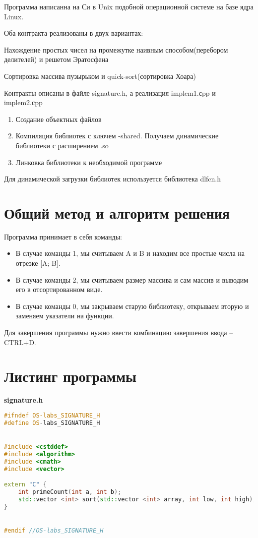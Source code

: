 \documentclass[pdf, unicode, 12pt, a4paper,oneside,fleqn]{article}
\begin{document}
Программа написанна на Си в Unix подобной операционной системе на базе ядра Linux.

Оба контракта реализованы в двух вариантах:

Нахождение простых чисел на промежутке наивным способом(перебором делителей) и решетом Эратосфена

Сортировка массива пузырьком и quick-sort(сортировка Хоара)

Контракты описаны в файле signature.h, а реализация implem1.сpp и implem2.сpp

\begin{enumerate}
    \item Создание объектных файлов
    \item Компиляция библиотек с ключем -shared. Получаем динамические библиотеки с расширением .so 
    \item Линковка библиотеки к необходимой программе
\end{enumerate}

Для динамической загрузки библиотек используется библиотека dlfcn.h

\section{Общий метод и алгоритм решения}

Программа принимает в себя команды: 
\begin{itemize}
    \item В случае команды 1, мы считываем A и B и находим все простые числа на отрезке [A; B].
    \item В случае команды 2, мы считываем размер массива и сам массив и выводим его в отсортированном виде.
    \item В случае команды 0, мы закрываем старую библиотеку, открываем вторую и заменяем указатели на функции.
\end{itemize}

Для завершения программы нужно ввести комбинацию завершения ввода \--- CTRL+D.

\section{Листинг программы}

{\large\textbf{signature.h}}

\begin{lstlisting}[language=C++]
#ifndef OS-labs_SIGNATURE_H
#define OS-labs_SIGNATURE_H


#include <cstddef>
#include <algorithm>
#include <cmath>
#include <vector>

extern "C" {
    int primeCount(int a, int b);
    std::vector <int> sort(std::vector <int> array, int low, int high);
}


#endif //OS-labs_SIGNATURE_H

\end{lstlisting}
\end{document}
